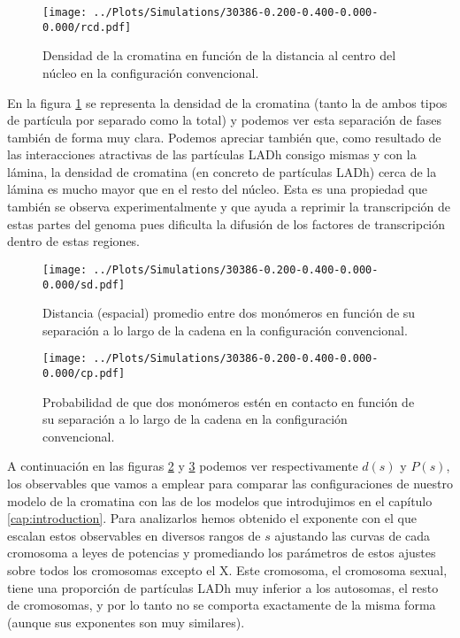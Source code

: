 \begin{figure}
    \centering
    \texttt{[image: ../Plots/Simulations/30386-0.200-0.400-0.000-0.000/rcd.pdf]}
    \caption{Densidad de la cromatina en función de la distancia al centro del núcleo en la configuración convencional.}
    \label{fig:rcd_c}
\end{figure}

En la figura \ref{fig:rcd_c} se representa la densidad de la cromatina (tanto la de ambos tipos de partícula por separado como la total) y podemos ver esta separación de fases también de forma muy clara. Podemos apreciar también que, como resultado de las interacciones atractivas de las partículas LADh consigo mismas y con la lámina, la densidad de cromatina (en concreto de partículas LADh) cerca de la lámina es mucho mayor que en el resto del núcleo. Esta es una propiedad que también se observa experimentalmente y que ayuda a reprimir la transcripción de estas partes del genoma pues dificulta la difusión de los factores de transcripción dentro de estas regiones.

\begin{figure}
    \centering
    \texttt{[image: ../Plots/Simulations/30386-0.200-0.400-0.000-0.000/sd.pdf]}
    \caption{Distancia (espacial) promedio entre dos monómeros en función de su separación a lo largo de la cadena en la configuración convencional.}
    \label{fig:sd_c}
\end{figure}

\begin{figure}
    \centering
    \texttt{[image: ../Plots/Simulations/30386-0.200-0.400-0.000-0.000/cp.pdf]}
    \caption{Probabilidad de que dos monómeros estén en contacto en función de su separación a lo largo de la cadena en la configuración convencional.}
    \label{fig:cp_c}
\end{figure}

A continuación en las figuras \ref{fig:sd_c} y \ref{fig:cp_c} podemos ver respectivamente $d(s)$ y $P(s)$, los observables que vamos a emplear para comparar las configuraciones de nuestro modelo de la cromatina con las de los modelos que introdujimos en el capítulo \ref{cap:introduction}. Para analizarlos hemos obtenido el exponente con el que escalan estos observables en diversos rangos de $s$ ajustando las curvas de cada cromosoma a leyes de potencias y promediando los parámetros de estos ajustes sobre todos los cromosomas excepto el X. Este cromosoma, el cromosoma sexual, tiene una proporción de partículas LADh muy inferior a los autosomas, el resto de cromosomas, y por lo tanto no se comporta exactamente de la misma forma (aunque sus exponentes son muy similares).


